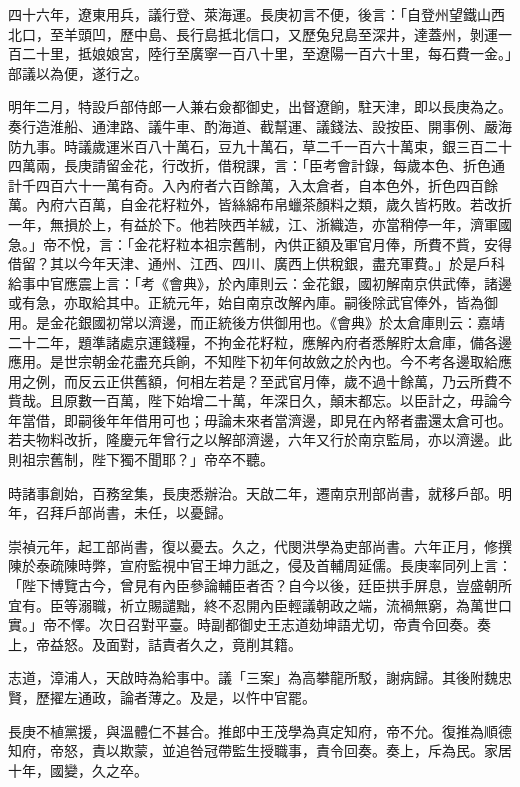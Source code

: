 \begin{pinyinscope}
四十六年，遼東用兵，議行登、萊海運。長庚初言不便，後言：「自登州望鐵山西北口，至羊頭凹，歷中島、長行島抵北信口，又歷兔兒島至深井，達蓋州，剝運一百二十里，抵娘娘宮，陸行至廣寧一百八十里，至遼陽一百六十里，每石費一金。」部議以為便，遂行之。

明年二月，特設戶部侍郎一人兼右僉都御史，出督遼餉，駐天津，即以長庚為之。奏行造淮船、通津路、議牛車、酌海道、截幫運、議錢法、設按臣、開事例、嚴海防九事。時議歲運米百八十萬石，豆九十萬石，草二千一百六十萬束，銀三百二十四萬兩，長庚請留金花，行改折，借稅課，言：「臣考會計錄，每歲本色、折色通計千四百六十一萬有奇。入內府者六百餘萬，入太倉者，自本色外，折色四百餘萬。內府六百萬，自金花籽粒外，皆絲綿布帛蠟茶顏料之類，歲久皆朽敗。若改折一年，無損於上，有益於下。他若陜西羊絨，江、浙織造，亦當稍停一年，濟軍國急。」帝不悅，言：「金花籽粒本祖宗舊制，內供正額及軍官月俸，所費不貲，安得借留？其以今年天津、通州、江西、四川、廣西上供稅銀，盡充軍費。」於是戶科給事中官應震上言：「考《會典》，於內庫則云：金花銀，國初解南京供武俸，諸邊或有急，亦取給其中。正統元年，始自南京改解內庫。嗣後除武官俸外，皆為御用。是金花銀國初常以濟邊，而正統後方供御用也。《會典》於太倉庫則云：嘉靖二十二年，題準諸處京運錢糧，不拘金花籽粒，應解內府者悉解貯太倉庫，備各邊應用。是世宗朝金花盡充兵餉，不知陛下初年何故斂之於內也。今不考各邊取給應用之例，而反云正供舊額，何相左若是？至武官月俸，歲不過十餘萬，乃云所費不貲哉。且原數一百萬，陛下始增二十萬，年深日久，顛末都忘。以臣計之，毋論今年當借，即嗣後年年借用可也；毋論未來者當濟邊，即見在內帑者盡還太倉可也。若夫物料改折，隆慶元年曾行之以解部濟邊，六年又行於南京監局，亦以濟邊。此則祖宗舊制，陛下獨不聞耶？」帝卒不聽。

時諸事創始，百務坌集，長庚悉辦治。天啟二年，遷南京刑部尚書，就移戶部。明年，召拜戶部尚書，未任，以憂歸。

崇禎元年，起工部尚書，復以憂去。久之，代閔洪學為吏部尚書。六年正月，修撰陳於泰疏陳時弊，宣府監視中官王坤力詆之，侵及首輔周延儒。長庚率同列上言：「陛下博覽古今，曾見有內臣參論輔臣者否？自今以後，廷臣拱手屏息，豈盛朝所宜有。臣等溺職，祈立賜譴黜，終不忍開內臣輕議朝政之端，流禍無窮，為萬世口實。」帝不懌。次日召對平臺。時副都御史王志道劾坤語尤切，帝責令回奏。奏上，帝益怒。及面對，詰責者久之，竟削其籍。

志道，漳浦人，天啟時為給事中。議「三案」為高攀龍所駁，謝病歸。其後附魏忠賢，歷擢左通政，論者薄之。及是，以忤中官罷。

長庚不植黨援，與溫體仁不甚合。推郎中王茂學為真定知府，帝不允。復推為順德知府，帝怒，責以欺蒙，並追咎冠帶監生授職事，責令回奏。奏上，斥為民。家居十年，國變，久之卒。


\end{pinyinscope}
